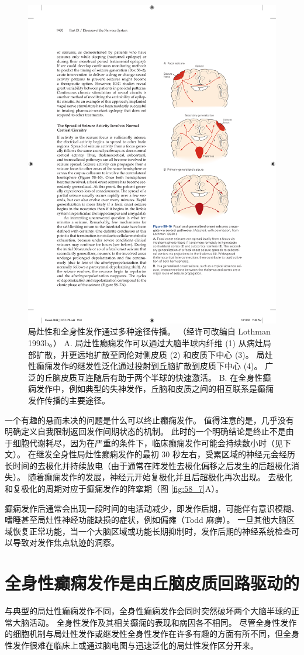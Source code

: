 \begin{figure}[htbp]
	\centering
	\includegraphics[width=0.4\linewidth]{chap58/fig_58_10}
	\caption{局灶性和全身性发作通过多种途径传播。 （经许可改编自 Lothman 1993b。） A. 局灶性癫痫发作可以通过大脑半球内纤维 (1) 从病灶局部扩散，并更远地扩散至同伦对侧皮质 (2) 和皮质下中心 (3)。 局灶性癫痫发作的继发性泛化通过投射到丘脑扩散到皮质下中心 (4)。 广泛的丘脑皮质互连随后有助于两个半球的快速激活。 B. 在全身性癫痫发作中，例如典型的失神发作，丘脑和皮质之间的相互联系是癫痫发作传播的主要途径。}
	\label{fig:58_10}
\end{figure}


一个有趣的悬而未决的问题是什么可以终止癫痫发作。
值得注意的是，几乎没有明确定义自我限制返回发作间期状态的机制。
此时的一个明确结论是终止不是由于细胞代谢耗尽，因为在严重的条件下，临床癫痫发作可能会持续数小时（见下文）。
在继发全身性局灶性癫痫发作的最初 30 秒左右，受累区域的神经元会经历长时间的去极化并持续放电（由于通常在阵发性去极化偏移之后发生的后超极化消失）。
随着癫痫发作的发展，神经元开始复极化并且后超极化再次出现。
去极化和复极化的周期对应于癫痫发作的阵挛期（图 \ref{fig:58_7}A）。


癫痫发作后通常会出现一段时间的电活动减少，即发作后期，可能伴有意识模糊、嗜睡甚至局灶性神经功能缺损的症状，例如偏瘫（Todd 麻痹）。
一旦其他大脑区域恢复正常功能，当一个大脑区域或功能长期抑制时，发作后期的神经系统检查可以导致对发作焦点轨迹的洞察。



\section{全身性癫痫发作是由丘脑皮质回路驱动的}

与典型的局灶性癫痫发作不同，全身性癫痫发作会同时突然破坏两个大脑半球的正常大脑活动。
全身性发作及其相关癫痫的表现和病因各不相同。
尽管全身性发作的细胞机制与局灶性发作或继发性全身性发作在许多有趣的方面有所不同，但全身性发作很难在临床上或通过脑电图与迅速泛化的局灶性发作区分开来。


